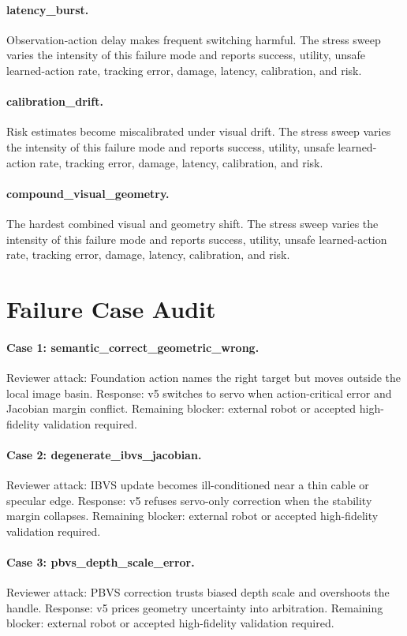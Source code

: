 \documentclass{article}
\begin{document}
\paragraph{latency\_burst.} Observation-action delay makes frequent switching harmful.
The stress sweep varies the intensity of this failure mode and reports success, utility, unsafe learned-action rate, tracking error, damage, latency, calibration, and risk.
\paragraph{calibration\_drift.} Risk estimates become miscalibrated under visual drift.
The stress sweep varies the intensity of this failure mode and reports success, utility, unsafe learned-action rate, tracking error, damage, latency, calibration, and risk.
\paragraph{compound\_visual\_geometry.} The hardest combined visual and geometry shift.
The stress sweep varies the intensity of this failure mode and reports success, utility, unsafe learned-action rate, tracking error, damage, latency, calibration, and risk.
\clearpage
\section{Failure Case Audit}
\paragraph{Case 1: semantic\_correct\_geometric\_wrong.} Reviewer attack: Foundation action names the right target but moves outside the local image basin. Response: v5 switches to servo when action-critical error and Jacobian margin conflict. Remaining blocker: external robot or accepted high-fidelity validation required.
\paragraph{Case 2: degenerate\_ibvs\_jacobian.} Reviewer attack: IBVS update becomes ill-conditioned near a thin cable or specular edge. Response: v5 refuses servo-only correction when the stability margin collapses. Remaining blocker: external robot or accepted high-fidelity validation required.
\paragraph{Case 3: pbvs\_depth\_scale\_error.} Reviewer attack: PBVS correction trusts biased depth scale and overshoots the handle. Response: v5 prices geometry uncertainty into arbitration. Remaining blocker: external robot or accepted high-fidelity validation required.
\end{document}
